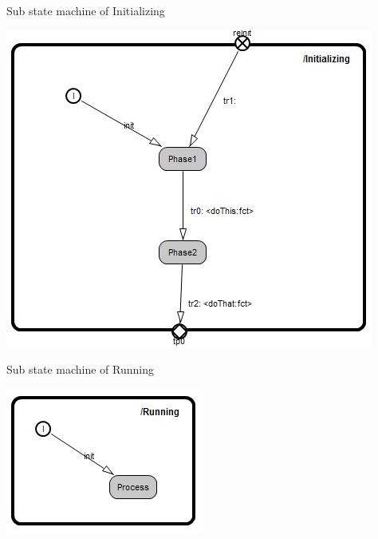 Sub state machine of Initializing

\includegraphics[scale=0.7]{images/040-HierarchicalFSMInitializing.jpg}

Sub state machine of Running

\includegraphics[scale=0.7]{images/040-HierarchicalFSMRunning.jpg}